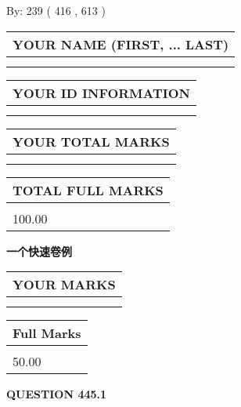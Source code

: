 \documentclass{ctexart}
\begin{document}
   
\hspace{1.0in} By: 
 239 ( 416 ,  613 )
   
   
   
   
\newpage 
\setcounter{page}{ 
   445001 } 
   
   
   
   
\noindent\begin{tabular}{|l|}
\hline
YOUR NAME (FIRST, ... LAST)  \\
\hline
 \\ 
 \\ 
\hline
\end{tabular}
\hspace{0.05in} \begin{tabular}{|l|}
\hline
 YOUR   ID   INFORMATION  \\
\hline
 \\ 
 \\ 
\hline
\end{tabular}
   
   
\vspace{0.2in}\noindent\begin{tabular}{|l|}
\hline
YOUR TOTAL MARKS  \\
\hline
 \\ 
 \\ 
\hline
\end{tabular}
\hspace{0.05in} \begin{tabular}{|l|}
\hline
TOTAL FULL MARKS  \\
\hline
 \\ 
100.00 \\
\hline
\end{tabular}
   
   
 \vspace{0.2in}
{\LARGE {\textbf{ 一个快速卷例}}}
   
   
  
\vspace{0.2in}
  
\noindent\begin{tabular}{|l|}
\hline
 YOUR MARKS  \\
\hline
 \\ 
 \\ 
\hline
\end{tabular}
\hspace{0.05in} \begin{tabular}{|l|}
\hline
 Full Marks  \\
\hline
 \\ 
50.00 \\
\hline
\end{tabular}
{\textbf{\Large{QUESTION
445.1 
}}}
  
\end{document}

